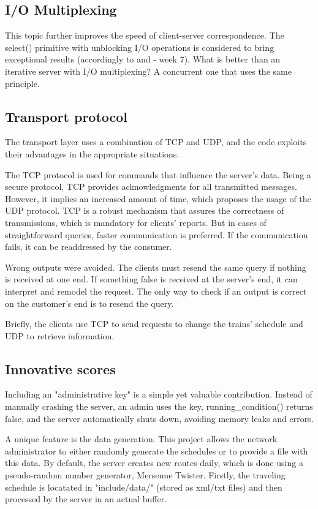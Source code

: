 \documentclass[runningheads]{llncs}
\begin{document}
\subsection{I/O Multiplexing}

This topic further improves the speed of client-server correspondence. The select() primitive with unblocking I/O operations is considered to bring exceptional results (accordingly to \cite{non-block-select} and \cite{course} - week 7). What is better than an iterative server with I/O multiplexing? A concurrent one that uses the same principle.

\subsection{Transport protocol}

The transport layer uses a combination of TCP and UDP, and the code exploits their advantages in the appropriate situations.

The TCP protocol is used for commands that influence the server's data. Being a secure protocol, TCP provides acknowledgments for all transmitted messages. However, it implies an increased amount of time, which proposes the usage of the UDP protocol. TCP is a robust mechanism that assures the correctness of transmissions, which is mandatory for clients' reports. But in cases of straightforward queries, faster communication is preferred. If the communication fails, it can be readdressed by the consumer.

Wrong outputs were avoided. The clients must resend the same query if nothing is received at one end. If something false is received at the server's end, it can interpret and remodel the request. The only way to check if an output is correct on the customer's end is to resend the query.

Briefly, the clients use TCP to send requests to change the trains' schedule and UDP to retrieve information.

\subsection{Innovative scores}

Including an "administrative key" is a simple yet valuable contribution. Instead of manually crashing the server, an admin uses the key, running\_condition() returns false, and the server automatically shuts down, avoiding memory leaks and errors.

A unique feature is the data generation. This project allows the network administrator to either randomly generate the schedules or to provide a file with this data. By default, the server creates new routes daily, which is done using a pseudo-random number generator, Mersenne Twister. Firstly, the traveling schedule is locatated in "include/data/" (stored as xml/txt files) and then processed by the server in an actual buffer.
\end{document}
